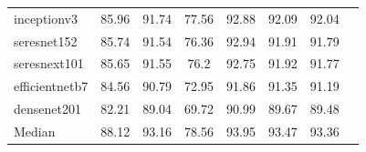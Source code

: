 \begin{table}[H]
{\begin{tabular}{lccccccc}
            inceptionv3             & 85.96          & 91.74          & 77.56
                                    & 92.88          & 92.09          & 92.04
            \\
            seresnet152             & 85.74          & 91.54          & 76.36
                                    & 92.94          & 91.91          & 91.79
            \\
            seresnext101            & 85.65          & 91.55          & 76.2
                                    & 92.75          & 91.92          & 91.77
            \\
            efficientnetb7          & 84.56          & 90.79          & 72.95
                                    & 91.86          & 91.35          & 91.19
            \\
            densenet201             & 82.21          & 89.04          & 69.72
                                    & 90.99          & 89.67          & 89.48
            \\
            \hdashline
            Median                  & 88.12          & 93.16          & 78.56
                                    & 93.95          & 93.47          & 93.36
            \\
            \bottomrule
        \end{tabular}
    }
\end{table}


